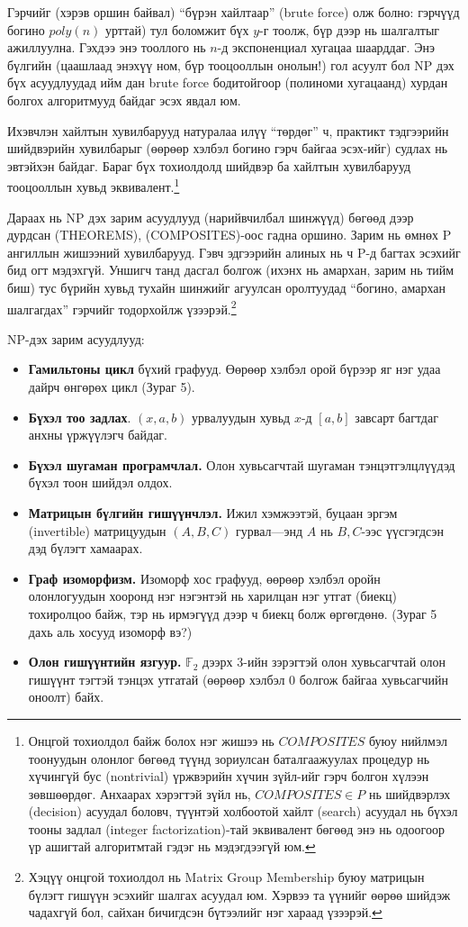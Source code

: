 Гэрчийг (хэрэв оршин байвал) “бүрэн хайлтаар” (brute force) олж болно: гэрчүүд богино $poly(n)$ урттай) тул боломжит бүх $y$-г тоолж, бүр дээр нь шалгалтыг ажиллуулна. Гэхдээ энэ тооллого нь $n$-д экспоненциал хугацаа шаарддаг. Энэ бүлгийн (цаашлаад энэхүү ном, бүр тооцооллын онолын!) гол асуулт бол NP дэх бүх асуудлуудад ийм дан brute force бодитойгоор (полиноми хугацаанд) хурдан болгох алгоритмууд байдаг эсэх явдал юм.


Ихэвчлэн хайлтын хувилбарууд натуралаа илүү “төрдөг” ч, практикт тэдгээрийн шийдвэрийн хувилбарыг (өөрөөр хэлбэл богино гэрч байгаа эсэх-ийг) судлах нь эвтэйхэн байдаг. Бараг бүх тохиолдолд шийдвэр ба хайлтын хувилбарууд тооцооллын хувьд эквивалент.\footnote{Онцгой тохиолдол байж болох нэг жишээ нь $COMPOSITES$ буюу нийлмэл тоонуудын олонлог бөгөөд түүнд зориулсан баталгаажуулах процедур нь хүчингүй бус (nontrivial) үржвэрийн хүчин зүйл-ийг гэрч болгон хүлээн зөвшөөрдөг.
Анхаарах хэрэгтэй зүйл нь, $COMPOSITES \in P$ нь шийдвэрлэх (decision) асуудал боловч, түүнтэй холбоотой хайлт (search) асуудал нь бүхэл тооны задлал (integer factorization)-тай эквивалент бөгөөд энэ нь одоогоор үр ашигтай алгоритмтай гэдэг нь мэдэгдээгүй юм.}


Дараах нь NP дэх зарим асуудлууд (нарийвчилбал шинжүүд) бөгөөд дээр дурдсан (\textsc{THEOREMS}), (\textsc{COMPOSITES})-оос гадна оршино. Зарим нь өмнөх P ангиллын жишээний хувилбарууд. Гэвч эдгээрийн алиных нь ч P-д багтах эсэхийг бид огт мэдэхгүй. Уншигч танд дасгал болгож (ихэнх нь амархан, зарим нь тийм биш) тус бүрийн хувьд тухайн шинжийг агуулсан оролтуудад “богино, амархан шалгагдах” гэрчийг тодорхойлж үзээрэй.\footnote{Хэцүү онцгой тохиолдол нь Matrix Group Membership буюу матрицын бүлэгт гишүүн эсэхийг шалгах асуудал юм. Хэрвээ та үүнийг өөрөө шийдэж чадахгүй бол, сайхан бичигдсэн \cite{BS84} бүтээлийг нэг хараад үзээрэй.}


NP-дэх зарим асуудлууд:
\begin{itemize}
  \item \textbf{Гамильтоны цикл} бүхий графууд. Өөрөөр хэлбэл орой бүрээр яг нэг удаа дайрч өнгөрөх цикл (Зураг 5).
  \item \textbf{Бүхэл тоо задлах}. $(x,a,b)$ урвалуудын хувьд $x$-д $[a,b]$ завсарт багтдаг анхны үржүүлэгч байдаг.
  \item \textbf{Бүхэл шугаман програмчлал.} Олон хувьсагчтай шугаман тэнцэтгэлцлүүдэд бүхэл тоон шийдэл олдох.
  \item \textbf{Матрицын бүлгийн гишүүнчлэл.} Ижил хэмжээтэй, буцаан эргэм (invertible) матрицуудын $(A,B,C)$ гурвал—энд $A$ нь $B,C$-ээс үүсгэгдсэн дэд бүлэгт хамаарах.
  \item \textbf{Граф изоморфизм.} Изоморф хос графууд, өөрөөр хэлбэл оройн олонлогуудын хооронд нэг нэгэнтэй нь харилцан нэг утгат (биекц) тохиролцоо байж, тэр нь ирмэгүүд дээр ч биекц болж өргөгдөнө. (Зураг 5 дахь аль хосууд изоморф вэ?)
  \item \textbf{Олон гишүүнтийн язгуур.} $\mathbb{F}_2$ дээрх 3-ийн зэрэгтэй олон хувьсагчтай олон гишүүнт тэгтэй тэнцэх утгатай (өөрөөр хэлбэл 0 болгож байгаа хувьсагчийн оноолт) байх.
\end{itemize}


